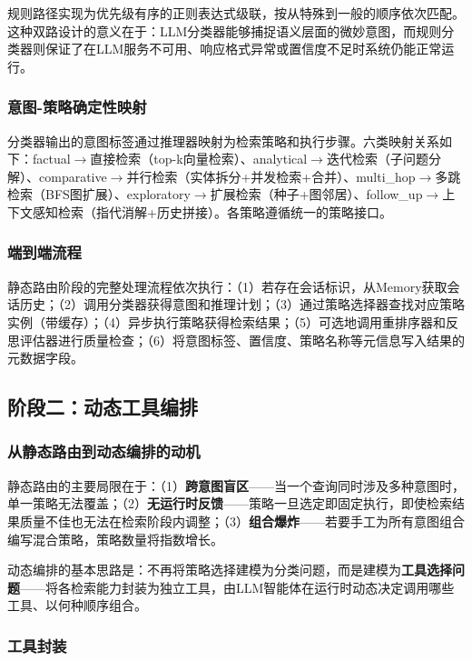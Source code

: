 \documentclass[runningheads]{llncs}
\begin{document}
规则路径实现为优先级有序的正则表达式级联，按从特殊到一般的顺序依次匹配。这种双路设计的意义在于：LLM分类器能够捕捉语义层面的微妙意图，而规则分类器则保证了在LLM服务不可用、响应格式异常或置信度不足时系统仍能正常运行。

\subsubsection{意图-策略确定性映射}

分类器输出的意图标签通过推理器映射为检索策略和执行步骤。六类映射关系如下：factual$\to$直接检索（top-k向量检索）、analytical$\to$迭代检索（子问题分解）、comparative$\to$并行检索（实体拆分+并发检索+合并）、multi\_hop$\to$多跳检索（BFS图扩展）、exploratory$\to$扩展检索（种子+图邻居）、follow\_up$\to$上下文感知检索（指代消解+历史拼接）。各策略遵循统一的策略接口。

\subsubsection{端到端流程}

静态路由阶段的完整处理流程依次执行：（1）若存在会话标识，从Memory获取会话历史；（2）调用分类器获得意图和推理计划；（3）通过策略选择器查找对应策略实例（带缓存）；（4）异步执行策略获得检索结果；（5）可选地调用重排序器和反思评估器进行质量检查；（6）将意图标签、置信度、策略名称等元信息写入结果的元数据字段。

\subsection{阶段二：动态工具编排}

\subsubsection{从静态路由到动态编排的动机}

静态路由的主要局限在于：（1）\textbf{跨意图盲区}——当一个查询同时涉及多种意图时，单一策略无法覆盖；（2）\textbf{无运行时反馈}——策略一旦选定即固定执行，即使检索结果质量不佳也无法在检索阶段内调整；（3）\textbf{组合爆炸}——若要手工为所有意图组合编写混合策略，策略数量将指数增长。

动态编排的基本思路是：不再将策略选择建模为分类问题，而是建模为\textbf{工具选择问题}——将各检索能力封装为独立工具，由LLM智能体在运行时动态决定调用哪些工具、以何种顺序组合。

\subsubsection{工具封装}
\end{document}

